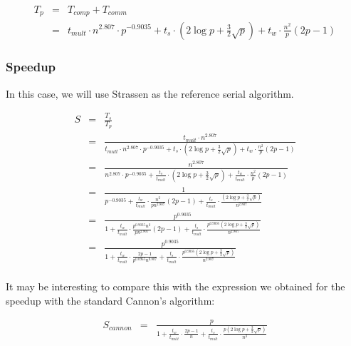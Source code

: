 \documentclass{article}
\begin{document}
\begin{eqnarray*}
T_p &=& T_{{comp}} + T_{{comm}} \\
&=& t_{{mult}} \cdot n^{2.807} \cdot  p^{-0.9035} + t_s \cdot \left(2 \log{p} + \frac{3}{2}\sqrt{p}\right) + t_w \cdot \frac{n^2}{p}(2p-1)
\end{eqnarray*}


\subsubsection{Speedup}

In this case, we will use Strassen as the reference serial algorithm.

\begin{eqnarray*}
S &=& \frac{T_s}{T_p} \\
&=& \frac{ t_{{mult}} \cdot n^{2.807} }{  t_{{mult}} \cdot n^{2.807} \cdot  p^{-0.9035} + t_s \cdot \left(2 \log{p} + \frac{3}{2}\sqrt{p}\right) + t_w \cdot \frac{n^2}{p}(2p-1) } \\
&=& \frac{ n^{2.807} }{  n^{2.807} \cdot  p^{-0.9035} + \frac{t_s}{t_{mult}} \cdot \left(2 \log{p} + \frac{3}{2}\sqrt{p}\right) + \frac{t_w}{t_{mult}} \cdot \frac{n^2}{p}(2p-1) } \\
&=& \frac{ 1 }{  p^{-0.9035} + \frac{t_w}{t_{mult}} \cdot \frac{n^2}{p  n^{2.807}}(2p-1) + \frac{t_s}{t_{mult}} \cdot \frac{ \left(2 \log{p} + \frac{3}{2}\sqrt{p}\right) }{ n^{2.807} }  } \\
&=& \frac{ p^{0.9035} }{  1 + \frac{t_w}{t_{mult}} \cdot \frac{p^{0.9035} n^2}{p  n^{2.807}}(2p-1) + \frac{t_s}{t_{mult}} \cdot \frac{ p^{0.9035} \left(2 \log{p} + \frac{3}{2}\sqrt{p}\right) }{ n^{2.807} }  } \\
&=& \frac{ p^{0.9035} }{  1 + \frac{t_w}{t_{mult}} \cdot \frac{ 2p-1}{p^{0.0965}  n^{0.807}} + \frac{t_s}{t_{mult}} \cdot \frac{ p^{0.9035} \left(2 \log{p} + \frac{3}{2}\sqrt{p}\right) }{ n^{2.807} }  } \\
\end{eqnarray*}

It may be interesting to compare this with the expression we obtained for the speedup with the standard Cannon's algorithm:

\begin{eqnarray*}
S_{cannon}&=& \frac{ p }{ 1 + \frac{t_w}{t_{mult}} \cdot \frac{2p-1}{n} + \frac{t_s}{t_{mult}} \cdot \frac{p\left(2 \log{p} + \frac{3}{2} \sqrt{p}\right)}{n^3} } \\
\end{eqnarray*}
\end{document}
